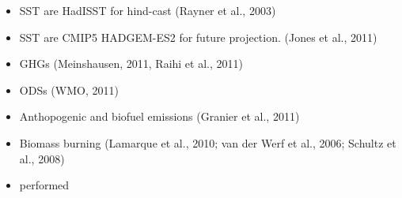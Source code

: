 \begin{itemize}
\item SST are HadISST for hind-cast (Rayner et al., 2003)
\item SST are CMIP5 HADGEM-ES2 for future projection. (Jones et al., 2011)
\item GHGs (Meinshausen, 2011, Raihi et al., 2011)
\item ODSs (WMO, 2011)
\item Anthopogenic and biofuel emissions (Granier et al., 2011)
\item Biomass burning (Lamarque et al., 2010; van der Werf et al., 2006; Schultz et al., 2008)
\item performed
\end{itemize}



